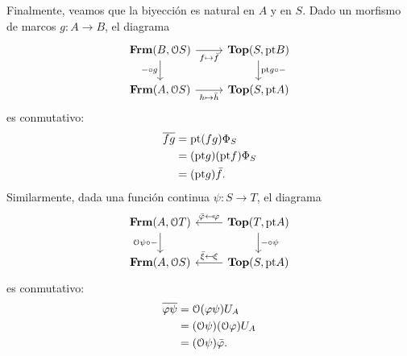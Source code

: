 \documentclass{comunicaciones}
\begin{document}
Finalmente, veamos que la biyección es natural en $A$ y en $S$.
Dado un morfismo de marcos $g:A\to B$, el diagrama
\[
    \begin{tikzcd}
        \Frm(B,\Cal OS) \ar[d,"{-}\circ g"'] \ar[r,"f\mapsto\bar f"']
        & \Top(S,\pt B)
        \ar[d,"\pt g\circ{-}"]
        \\
        \Frm(A,\Cal OS) \ar[r,"h\mapsto\bar h"']
        & \Top(S,\pt A)
    \end{tikzcd}
\]
es conmutativo:
\begin{align*}
    \overline{fg}
    &= \mathrm{pt}(f g)\Phi_S \\
    &= (\mathrm{pt} g)(\mathrm{pt} f)\Phi_S \\
    &= (\mathrm{pt} g)\bar f.
\end{align*}
Similarmente, dada una función continua $\psi:S\to T$,
el diagrama
\[
    \begin{tikzcd}
        \Frm(A,\Cal OT)
        \ar[d,"\Cal O\psi\circ{-}"']
        & \Top(T,\pt A) \ar[l,"\bar \phi\mapsfrom \phi"']
        \ar[d,"{-}\circ \psi"]
        \\
        \Frm(A,\Cal OS)
        & \Top(S,\pt A) \ar[l,"\bar \xi\mapsfrom \xi"']
    \end{tikzcd}
\]
es conmutativo:
\begin{align*}
    \overline{\varphi\psi}
    &= \mathcal{O}(\varphi\psi)U_A \\
    &= (\mathcal{O}\psi)(\mathcal{O}\varphi)U_A \\
    &= (\mathcal{O}\psi)\bar{\varphi}.
\end{align*}








\end{document}
